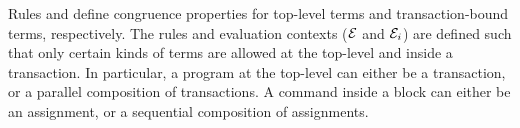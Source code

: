 \noindent Rules  and  define
congruence properties for top-level terms and transaction-bound terms,
respectively. The rules and evaluation contexts ($\mathcal{E}$ and
$\mathcal{E}_i$) are defined such that only certain kinds of terms are
allowed at the top-level and inside a transaction. In particular, a
\txnimp program at the top-level can either be a transaction, or a
parallel composition of transactions. A command inside a  block
can either be an assignment, or a sequential composition of
assignments. 


